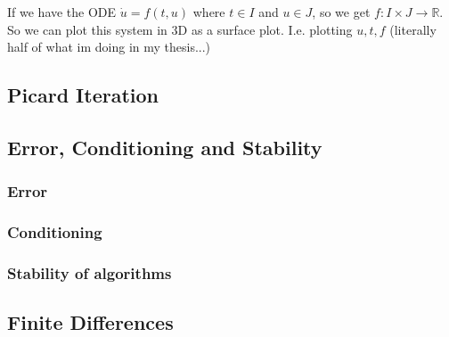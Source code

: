 \documentclass{/home/janmebows/Documents/LatexTemplates/myassignment}
\begin{document}
If we have the ODE $\dot u = f(t,u)$ where $t \in I$ and $u \in J$, so we get $f:I\times J \to \mathbb{R}$. So we can plot this system in 3D as a surface plot. I.e. plotting $u,t,f$ (literally half of what im doing in my thesis...)








\subsection{Picard Iteration}



\subsection{Error, Conditioning and Stability}

\subsubsection{Error}

\subsubsection{Conditioning}

\subsubsection{Stability of algorithms}



\subsection{Finite Differences}
\end{document}
